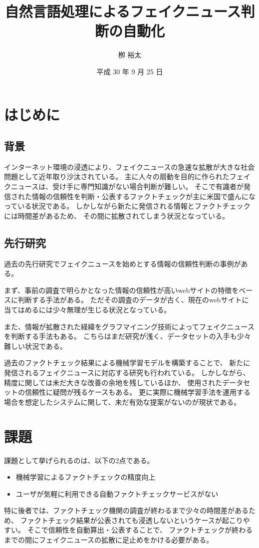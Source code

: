 \documentclass[twocolumn, a4paper, uplatex]{UECIEresume}
\title{自然言語処理によるフェイクニュース判断の自動化}
\date{平成 30 年 9 月 25 日}
\affiliation{総合情報学科 メディア情報学 コース}
\author{栁 裕太}
\begin{document}
\maketitle

\section{はじめに}
\subsection{背景}
インターネット環境の浸透により、フェイクニュースの急速な拡散が大きな社会問題として近年取り沙汰されている。
主に人々の扇動を目的に作られたフェイクニュースは、受け手に専門知識がない場合判断が難しい。
そこで有識者が発信された情報の信頼性を判断・公表するファクトチェックが主に米国で盛んになっている状況である。
しかしながら新たに発信される情報とファクトチェックには時間差があるため、
その間に拡散されてしまう状況となっている。

\subsection{先行研究}
過去の先行研究でフェイクニュースを始めとする情報の信頼性判断の事例がある。

まず、事前の調査で明らかとなった情報の信頼性が高いwebサイトの特徴をベースに判断する手法\cite{fuk}がある。
ただその調査のデータが古く、現在のwebサイトに当てはめるには少々無理が生じる状況となっている。

また、情報が拡散された経緯をグラフマイニング技術によってフェイクニュースを判断する手法\cite{foot}もある。
こちらはまだ研究が浅く、データセットの入手も少々難しい状況である。

過去のファクトチェック結果による機械学習モデルを構築することで、
新たに発信されるフェイクニュースに対応する研究も行われている\cite{nb}\cite{gilda}。
しかしながら、精度に関しては未だ大きな改善の余地を残しているほか、
使用されたデータセットの信頼性に疑問が残るケースもある。
更に実際に機械学習手法を運用する場合を想定したシステムに関して、未だ有効な提案がないのが現状である。

\section{課題}
課題として挙げられるのは、以下の2点である。
\begin{itemize}
  \item 機械学習によるファクトチェックの精度向上
  \item ユーザが気軽に利用できる自動ファクトチェックサービスがない
\end{itemize}
特に後者では、ファクトチェック機関の調査が終わるまで少々の時間差があるため、
ファクトチェック結果が公表されても浸透しないというケースが起こりやすい。
そこで信頼性を自動算出・公表することで、
ファクトチェックが終わるまでの間にフェイクニュースの拡散に足止めをかける必要がある。
\end{document}
